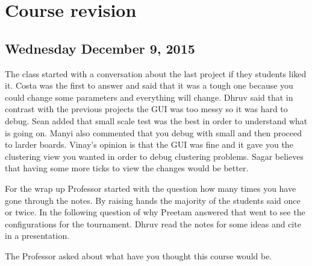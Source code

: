 \section{Course revision}
\subsection{Wednesday December 9, 2015}
The class started with a conversation about the last project if they students liked 
it. Costa was the first to answer and said that it was a tough one because you
could change some parameters and everything will change. Dhruv said that in contrast
with the previous projects the GUI was too messy so it was hard to debug. Sean
added that small scale test was the best in order to understand what is going on.
Manyi also commented that you debug with small and then proceed to larder boards.
Vinay's opinion is that the GUI was fine and it gave you the clustering view you 
wanted in order to debug clustering problems. Sagar believes that having some more
ticks to view the changes would be better.

For the wrap up Professor started with the question how many times you have gone
through the notes. By raising hands the majority of the students said once or twice.
In the following question of why Preetam answered that went to see the configurations
for the tournament. Dhruv read the notes for some ideas and cite in a presentation.

The Professor asked about what have you thought this course would be.

